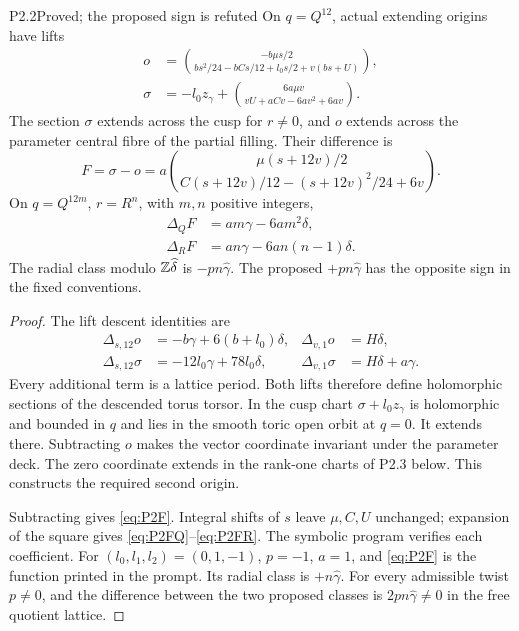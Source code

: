 \begin{statement}{P2.2}{Proved; the proposed sign is refuted}
On $q=Q^{12}$, actual extending origins have lifts
\begin{align*}
 o&=\binom{-b\mu s/2}{bs^2/24-bCs/12+l_0s/2+v(bs+U)},\\
 \sigma&=-l_0z_\gamma+\binom{6a\mu v}{vU+aCv-6av^2+6av}.
\end{align*}
The section $\sigma$ extends across the cusp for $r\ne0$, and $o$ extends across the parameter central fibre of the partial filling. Their difference is
\begin{equation}\label{eq:P2F}
 F=\sigma-o=a\binom{\mu(s+12v)/2}{C(s+12v)/12-(s+12v)^2/24+6v}.
\end{equation}
On $q=Q^{12m}$, $r=R^n$, with $m,n$ positive integers,
\begin{align}
 \Delta_QF&=am\gamma-6am^2\delta,\label{eq:P2FQ}\\
 \Delta_RF&=an\gamma-6an(n-1)\delta.\label{eq:P2FR}
\end{align}
The radial class modulo $\mathbb Z\widehat\delta$ is $-pn\widehat\gamma$. The proposed $+pn\widehat\gamma$ has the opposite sign in the fixed conventions.
\end{statement}
\begin{proof}
The lift descent identities are
\begin{align*}
 \Delta_{s,12}o&=-b\gamma+6(b+l_0)\delta,&\Delta_{v,1}o&=H\delta,\\
 \Delta_{s,12}\sigma&=-12l_0\gamma+78l_0\delta,&\Delta_{v,1}\sigma&=H\delta+a\gamma.
\end{align*}
Every additional term is a lattice period. Both lifts therefore define holomorphic sections of the descended torus torsor. In the cusp chart $\sigma+l_0z_\gamma$ is holomorphic and bounded in $q$ and lies in the smooth toric open orbit at $q=0$. It extends there. Subtracting $o$ makes the vector coordinate invariant under the parameter deck. The zero coordinate extends in the rank-one charts of P2.3 below. This constructs the required second origin.

Subtracting gives \eqref{eq:P2F}. Integral shifts of $s$ leave $\mu,C,U$ unchanged; expansion of the square gives \eqref{eq:P2FQ}--\eqref{eq:P2FR}. The symbolic program verifies each coefficient. For $(l_0,l_1,l_2)=(0,1,-1)$, $p=-1$, $a=1$, and \eqref{eq:P2F} is the function printed in the prompt. Its radial class is $+n\widehat\gamma$. For every admissible twist $p\ne0$, and the difference between the two proposed classes is $2pn\widehat\gamma\ne0$ in the free quotient lattice.
\end{proof}

